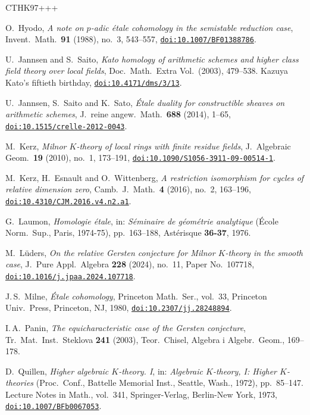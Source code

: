 \documentclass[10pt,a4paper]{article}
\providecommand{\doi}[2][]{\href{https://doi.org/#2}{\nolinkurl{doi:#2}}}
\numberwithin{equation}{section}
\newtheorem{Key lemma}[theorem]{Key lemma}
\theoremstyle{definition}
\theoremstyle{remark}
\begin{document}
\begin{thebibliography}{CTHK97+++}
  
O.~Hyodo, \emph{A note on {$p$}-adic \'{e}tale cohomology in the semistable
  reduction case}, Invent.\ Math.\ \textbf{91} (1988), no.~3, 543--557,
  \doi{10.1007/BF01388786}.

U.~Jannsen and S.~Saito, \emph{Kato homology of arithmetic schemes and higher
  class field theory over local fields}, Doc.\ Math.\ Extra Vol.\ (2003), 
  479--538. Kazuya Kato's fiftieth birthday, \doi{10.4171/dms/3/13}.

U.~Jannsen, S.~Saito and K.~Sato, \emph{\'{E}tale duality for constructible
  sheaves on arithmetic schemes}, J.~reine angew.\ Math.\ \textbf{688} (2014),
  1--65, \doi{10.1515/crelle-2012-0043}.

M.~Kerz, \emph{Milnor {$K$}-theory of local rings with finite residue fields},
  J.~Algebraic Geom.\ \textbf{19} (2010), no.~1, 173--191,
  \doi{10.1090/S1056-3911-09-00514-1}.

M.~Kerz, H.~Esnault and O.~Wittenberg, \emph{A restriction isomorphism for
  cycles of relative dimension zero}, Camb.~J.\ Math.\ \textbf{4} (2016), no.~2,
  163--196, \doi{10.4310/CJM.2016.v4.n2.a1}.

G.~Laumon, \emph{Homologie \'{e}tale}, in: \emph{S\'{e}minaire de g\'{e}om\'{e}trie analytique} (\'{E}cole {N}orm.\ {S}up., {P}aris, 1974-75),  pp.~163--188,  Ast\'{e}risque \textbf{36-37}, 1976.

M.~L{\"u}ders, \emph{On the relative {Gersten} conjecture for {Milnor}
  {{\(K\)}}-theory in the smooth case}, J.~Pure Appl.\ Algebra \textbf{228}
  (2024), no.~11, Paper No.~107718, \doi{10.1016/j.jpaa.2024.107718}.

J.\,S.~Milne, \emph{\'Etale cohomology}, Princeton Math.\ Ser., vol.~33,
  Princeton Univ.\ Press, Princeton, NJ, 1980, \doi{10.2307/jj.28248894}.

I.\,A.~Panin, \emph{The equicharacteristic case of the {G}ersten conjecture}, Tr.\ Mat.\ Inst.\ Steklova \textbf{241} (2003), Teor.\ Chisel, Algebra i Algebr.\  Geom., 169--178.

D.~Quillen, \emph{Higher algebraic {$K$}-theory. {I}}, in: \emph{Algebraic {$K$}-theory, {I}: {H}igher {$K$}-theories} ({P}roc.\ {C}onf., {B}attelle {M}emorial {I}nst., {S}eattle, {W}ash., 1972), pp.~85--147. Lecture Notes in Math., vol.~341, Springer-Verlag, Berlin-New York, 1973, \doi{10.1007/BFb0067053}.


\end{thebibliography}
\end{document}
